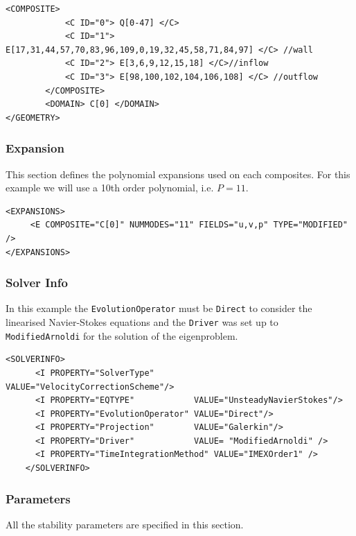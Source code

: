   \begin{lstlisting}[style=XMLStyle]
              <COMPOSITE>            
            <C ID="0"> Q[0-47] </C>
            <C ID="1"> E[17,31,44,57,70,83,96,109,0,19,32,45,58,71,84,97] </C> //wall
            <C ID="2"> E[3,6,9,12,15,18] </C>//inflow 
            <C ID="3"> E[98,100,102,104,106,108] </C> //outflow
        </COMPOSITE>
        <DOMAIN> C[0] </DOMAIN>
</GEOMETRY>
  \end{lstlisting}
              
  \subsubsection{Expansion}
  
  This section defines the polynomial expansions used on each composites. For this example we will use a 10th order polynomial, i.e. $P=11$.
  
  \begin{lstlisting}[style=XMLStyle]
<EXPANSIONS>
     <E COMPOSITE="C[0]" NUMMODES="11" FIELDS="u,v,p" TYPE="MODIFIED" />
</EXPANSIONS>
  \end{lstlisting}
  
  \subsubsection{Solver Info}
  
  In this example the \texttt{EvolutionOperator} must be \texttt{Direct} to consider the linearised Navier-Stokes equations and the \texttt{Driver} was set up to \texttt{ModifiedArnoldi} for the solution of the eigenproblem. 
  
    \begin{lstlisting}[style=XMLStyle]
      <SOLVERINFO>
      <I PROPERTY="SolverType"        VALUE="VelocityCorrectionScheme"/>
      <I PROPERTY="EQTYPE"            VALUE="UnsteadyNavierStokes"/>
      <I PROPERTY="EvolutionOperator" VALUE="Direct"/>
      <I PROPERTY="Projection"        VALUE="Galerkin"/>
      <I PROPERTY="Driver"            VALUE= "ModifiedArnoldi" />
      <I PROPERTY="TimeIntegrationMethod" VALUE="IMEXOrder1" />    
    </SOLVERINFO>
      \end{lstlisting}


\subsubsection{Parameters}

All the stability parameters are specified in this section. 

